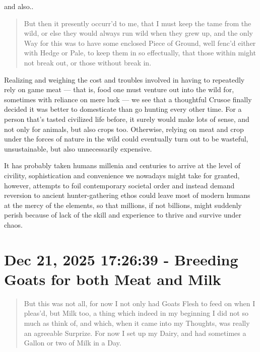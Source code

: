\documentclass[a4paper]{article}
\begin{document}
and also..


\noindent
\begin{minipage}{1\textwidth}
\vspace{1em}
\begin{quotation}
{\ttfamily

But then it presently occurr’d to me, that I must keep the tame from the wild, or else they would always run wild when they grew up, and the only Way for this was to have some enclosed Piece of Ground, well fenc’d either with Hedge or Pale, to keep them in so effectually, that those within might not break out, or those without break in.

}
\end{quotation}
\vspace{1em}
\end{minipage}


Realizing and weighing the cost and troubles involved in having to repeatedly rely on game meat --- that is, food one must venture out into the wild for, sometimes with reliance on mere luck --- we see that a thoughtful Crusoe finally decided it was better to domesticate than go hunting every other time. For a person that's tasted civilized life before, it surely would make lots of sense, and not only for animals, but also crops too. Otherwise, relying on meat and crop under the forces of nature in the wild could eventually turn out to be wasteful, unsustainable, but also unnecessarily expensive. 

It has probably taken humans millenia and centuries to arrive at the level of civility, sophistication and convenience we nowadays might take for granted, however, attempts to foil contemporary societal order and instead demand reversion to ancient hunter-gathering ethos could leave most of modern humans at the mercy of the elements, so that millions, if not billions, might suddenly perish because of lack of the skill and experience to thrive and survive under chaos.




\section{Dec 21, 2025 17:26:39 - Breeding Goats for both Meat and Milk}
\label{SEC38}



\noindent
\begin{minipage}{1\textwidth}
\vspace{1em}
\begin{quotation}
{\ttfamily

But this was not all, for now I not only had Goats Flesh to feed on when I pleas’d, but Milk too, a thing which indeed in my beginning I did not so much as think of, and which, when it came into my Thoughts, was really an agreeable Surprize. For now I set up my Dairy, and had sometimes a Gallon or two of Milk in a Day.

}
\end{quotation}
\vspace{1em}
\end{minipage}
\end{document}
